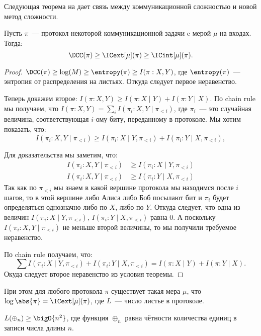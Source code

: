 Следующая теорема на дает связь между коммуникационной сложностью и новой метод сложности.

\begin{theorem}
    Пусть $\pi$~--- протокол некоторой коммуникационной задачи c мерой $\mu$ на входах. Тогда:
    $$
        \DCC(\pi) \ge \ICext[\mu](\pi) \ge \ICint[\mu](\pi).
    $$ 
\end{theorem}

\begin{proof}
    $\DCC(\pi) \ge \log(M) \ge \entropy(\pi) \ge I(\pi : X, Y)$, где $\entropy(\pi)$~--- энтропия от
    распределения на листьях. Откуда следует первое неравенство.
    
    Теперь докажем второе: $I(\pi : X, Y) \ge I(\pi : X \mid Y) + I(\pi : Y \mid X)$. По chain rule мы
    получаем, что $I(\pi : X, Y) = \sum\limits_i I(\pi_i : X, Y \mid \pi_{< i})$, где $\pi_i$~--- это
    случайная величина, соответствующая $i$-ому биту, переданному в протоколе. Мы хотим показать, что:
    $$
        I(\pi_i : X, Y \mid \pi_{< i}) \ge I(\pi_i : X \mid Y, \pi_{< i}) +
        I(\pi_i : Y \mid X, \pi_{< i}),
    $$

    Для доказательства мы заметим, что:
    \begin{align*}
      I(\pi_i : X, Y \mid \pi_{< i}) &\ge I(\pi_i : X \mid Y, \pi_{< i}) \\
      I(\pi_i : X, Y \mid \pi_{< i}) &\ge I(\pi_i : Y \mid X, \pi_{< i})
    \end{align*}
    Так как по $\pi_{< i}$ мы знаем в какой вершине протокола мы находимся после $i$ шагов, то в этой
    вершине либо Алиса либо Боб посылают бит и $\pi_i$ будет определяться однозначно либо по $X$, либо по
    $Y$. Откуда следует, что одна из величин $I(\pi_i : X \mid Y, \pi_{< i})$, $I(\pi_i : Y \mid X,
    \pi_{< i})$ равна $0$. А поскольку $I(\pi_i : X, Y \mid \pi_{< i})$ не меньше второй величины, то мы
    получили требуемое неравенство.

    По chain rule получаем, что:
    $$
        \sum I(\pi_i : X \mid Y, \pi_{< i}) + I(\pi_i : Y \mid X, \pi_{< i}) =
        I(\pi : X \mid Y) + I(\pi : Y \mid X).
    $$ 
    Окуда следует второе неравенство из условия теоремы.
\end{proof}

При этом  для любого протокола $\pi$ существует такая мера $\mu$, что $\log \abs{\pi} = \ICext[\mu](\pi)$,
где $L$~--- число листье в протоколе.

\begin{theorem}[Храпченко]
    $L(\oplus_n) \ge \bigO{n^2}$, где функция $\oplus_n$ равна чётности количества единиц в записи числа
    длины $n$.
\end{theorem}

